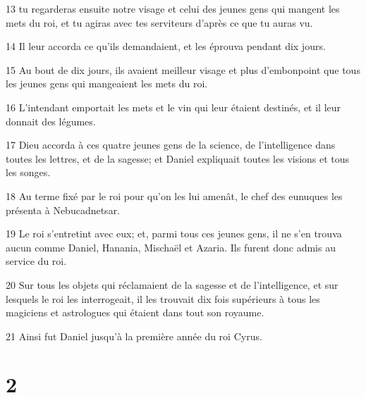 \par 13 tu regarderas ensuite notre visage et celui des jeunes gens qui mangent les mets du roi, et tu agiras avec tes serviteurs d'après ce que tu auras vu.
\par 14 Il leur accorda ce qu'ils demandaient, et les éprouva pendant dix jours.
\par 15 Au bout de dix jours, ils avaient meilleur visage et plus d'embonpoint que tous les jeunes gens qui mangeaient les mets du roi.
\par 16 L'intendant emportait les mets et le vin qui leur étaient destinés, et il leur donnait des légumes.
\par 17 Dieu accorda à ces quatre jeunes gens de la science, de l'intelligence dans toutes les lettres, et de la sagesse; et Daniel expliquait toutes les visions et tous les songes.
\par 18 Au terme fixé par le roi pour qu'on les lui amenât, le chef des eunuques les présenta à Nebucadnetsar.
\par 19 Le roi s'entretint avec eux; et, parmi tous ces jeunes gens, il ne s'en trouva aucun comme Daniel, Hanania, Mischaël et Azaria. Ils furent donc admis au service du roi.
\par 20 Sur tous les objets qui réclamaient de la sagesse et de l'intelligence, et sur lesquels le roi les interrogeait, il les trouvait dix fois supérieurs à tous les magiciens et astrologues qui étaient dans tout son royaume.
\par 21 Ainsi fut Daniel jusqu'à la première année du roi Cyrus.

\chapter{2}

